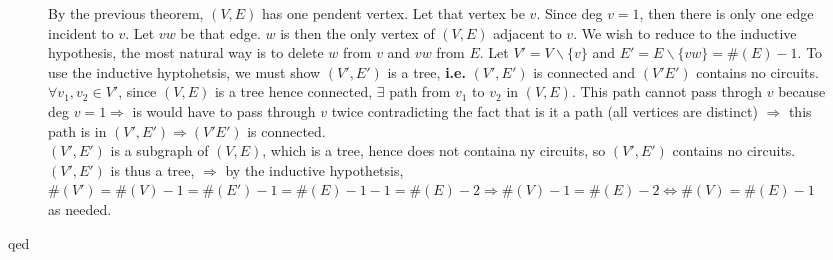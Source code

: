 \documentclass[10pt]{article}
\begin{document}
\begin{description}
\begin{description}
			By the previous theorem, $(V, E)$ has one pendent vertex. Let that vertex be $v$. Since deg $v = 1$, then there is only one edge incident to $v$. Let $vw$ be that edge. $w$ is then the only vertex of $(V, E)$ adjacent to $v$. We wish to reduce to the inductive hypothesis, the most natural way is to delete $w$ from $v$ and $vw$ from $E$. Let $V' = V \backslash \{v\}$ and $E' = E \backslash\{vw\} = \#(E) -1$. To use the inductive hyptohetsis, we must show $(V', E')$ is a tree, \textbf{i.e.} $(V', E')$ is connected and $(V' E')$ contains no circuits. $\forall v_1, v_2 \in V'$, since $(V, E)$ is a tree hence connected, $\exists$ path from $v_1$ to $v_2$ in $(V, E)$. This path cannot pass throgh $v$ because deg $v = 1 \Rightarrow$ is would have to pass through $v$ twice contradicting the fact that is it a path (all vertices are distinct) $\Rightarrow$ this path is in $(V', E') \Rightarrow (V' E')$ is connected. \\
			$(V', E')$ is a subgraph of $(V, E)$, which is a tree, hence does not containa ny circuits, so $(V', E')$ contains no circuits. \\
			$(V', E')$ is thus a tree, $\Rightarrow$ by the inductive hypothetsis, $\# (V') = \# (V) -1 = \# (E') - 1 = \# (E) -1 -1 = \#(E) - 2 \Rightarrow \#(V) -1 = \#(E) - 2 \Leftrightarrow \# (V) = \# (E)-1$ as needed.
			\item[qed]			
		\end{description}
	\end{description}
\end{document}
